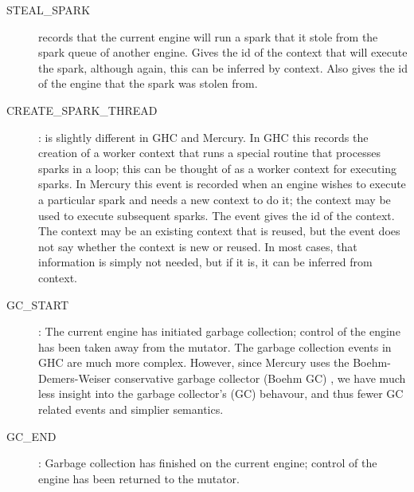 \begin{description}
\item[STEAL\_SPARK]
records that the current engine will run a spark
that it stole from the spark queue of another engine.
Gives the id of the context that will execute the spark,
although again, this can be inferred by context.
Also gives the id of the engine that the spark was stolen from.

\item[CREATE\_SPARK\_THREAD]:
is slightly different in GHC and Mercury.
In GHC this records the creation of a worker context that runs a special
routine that processes sparks in a loop;
this can be thought of as a worker context for executing sparks.
In Mercury this event is recorded when an engine wishes to execute a particular
spark and needs a new context to do it;
the context may be used to execute subsequent sparks.
The event gives the id of the context.
The context may be an existing context that is reused,
but the event does not say whether the context is new or reused.
In most cases, that information is simply not needed,
but if it is, it can be inferred from context.

\item[GC\_START]:
The current engine has initiated garbage collection;
control of the engine has been taken away from the mutator.
The garbage collection events in GHC are much more complex.
However, since Mercury uses the
Boehm-Demers-Weiser conservative garbage collector (Boehm GC)
\citep{boehm:1988:gc},
we have much less insight into the garbage collector's (GC) behavour,
and thus fewer GC related events and simplier semantics.

\item[GC\_END]:
Garbage collection has finished on the current engine;
control of the engine has been returned to the mutator.

\end{description}

